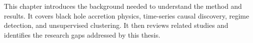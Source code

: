This chapter introduces the background needed to understand the method and results. It covers black hole accretion physics, time-series causal discovery, regime detection, and unsupervised clustering. It then reviews related studies and identifies the research gaps addressed by this thesis.






